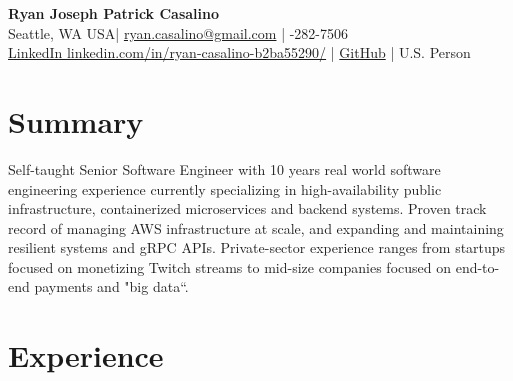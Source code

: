 \documentclass[10pt,letterpaper]{article}
\begin{document}
\vspace{0.4em}

\begin{center}
  {\Huge\sffamily\bfseries\color{accentcolor} Ryan Joseph Patrick Casalino}\\[0.6em]
  \small
  Seattle, WA USA\quad | \quad
  \href{mailto:ryan.casalino@gmail.com}{ryan.casalino@gmail.com} \quad | -282-7506\\[0.3em]
  \href{https://www.linkedin.com/in/ryan-casalino-b2ba55290/}{LinkedIn \textdagger linkedin.com/in/ryan-casalino-b2ba55290/}
  \quad | \quad
        \href{https://www.github.com/rjpcasalino}{GitHub} \quad | \quad U.S. Person \href{https://www.irs.gov/individuals/international-taxpayers/classification-of-taxpayers-for-us-tax-purposes}{\textdagger}
\end{center}

\vspace{0.6em}

\section{Summary}
Self-taught Senior Software Engineer with 10 years real world software engineering experience currently specializing in high-availability public infrastructure, containerized microservices and backend systems. Proven track record of managing AWS infrastructure at scale, and expanding and maintaining resilient systems and gRPC APIs. Private-sector experience ranges from startups focused on monetizing Twitch streams to mid-size companies focused on end-to-end payments and "big data``.

\section{Experience}
\end{document}
